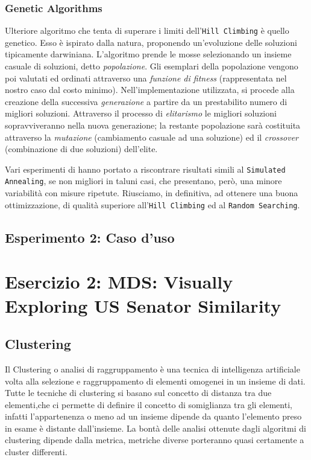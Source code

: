 			\subsubsection{Genetic Algorithms}
				Ulteriore algoritmo che tenta di superare i limiti dell'\texttt{Hill Climbing} è quello genetico. Esso è ispirato dalla natura, proponendo un'evoluzione delle soluzioni tipicamente darwiniana. L'algoritmo prende le mosse selezionando un insieme casuale di soluzioni, detto \emph{popolazione}. Gli esemplari della popolazione vengono poi valutati ed ordinati attraverso una \emph{funzione di fitness} (rappresentata nel nostro caso dal costo minimo). Nell'implementazione utilizzata, si procede alla creazione della successiva \emph{generazione} a partire da un prestabilito numero di migliori soluzioni. Attraverso il processo di \emph{elitarismo} le migliori soluzioni sopravviveranno nella nuova generazione; la restante popolazione sarà costituita attraverso la \emph{mutazione} (cambiamento casuale ad una soluzione) ed il \emph{crossover} (combinazione di due soluzioni) dell'elite.\par
				Vari esperimenti di hanno portato a riscontrare risultati simili  al \texttt{Simulated Annealing}, se non migliori in taluni casi, che presentano, però, una minore variabilità con misure ripetute. Riusciamo, in definitiva, ad ottenere una buona ottimizzazione, di qualità superiore all'\texttt{Hill Climbing} ed al \texttt{Random Searching}.
		\subsection{Esperimento 2: Caso d'uso}
	\section{Esercizio 2: MDS: Visually Exploring US Senator Similarity}
		\label{sec:es2}
			\subsection{Clustering}
				Il Clustering o analisi di raggruppamento è una tecnica di intelligenza artificiale volta alla selezione e raggruppamento di elementi omogenei in un insieme di dati. Tutte le tecniche di clustering si basano sul concetto di distanza tra due elementi,che ci permette di definire il concetto di somiglianza tra gli elementi, infatti l'appartenenza o meno ad un insieme dipende da quanto l'elemento preso in esame è distante dall'insieme. La bontà delle analisi ottenute dagli algoritmi di clustering dipende dalla metrica, metriche diverse porteranno quasi certamente a cluster differenti.
				
